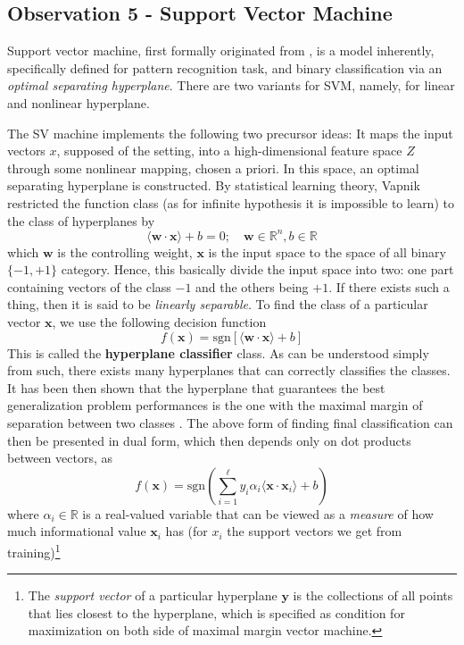 \documentclass[twoside,10pt]{article}
\begin{document}
\clearpage

\subsection{Observation 5 - Support Vector Machine}

Support vector machine, first formally originated from \cite{Vapnik1999-VAPTNO}, is a model inherently, specifically defined for pattern recognition task, and binary classification via an \textit{optimal separating hyperplane}. There are two variants for SVM, namely, for linear and nonlinear hyperplane. 

The SV machine implements the following two precursor ideas: It maps the input vectors $x$, supposed of the setting, into a high-dimensional feature space $Z$ through some nonlinear mapping, chosen a priori. In this space, an optimal separating hyperplane is constructed. By statistical learning theory, Vapnik restricted the function class (as for infinite hypothesis it is impossible to learn) to the class of hyperplanes by 
\begin{equation}
    \langle \mathbf{w}\cdot \mathbf{x} \rangle + b = 0 ; \quad \mathbf{w}\in \mathbb{R}^{n} , b\in \mathbb{R}
\end{equation}
which $\mathbf{w}$ is the controlling weight, $\mathbf{x}$ is the input space to the space of all binary $\{-1,+1\}$ category. Hence, this basically divide the input space into two: one part containing vectors of the class $-1$ and the others being $+1$. If there exists such a thing, then it is said to be \textit{linearly separable}. To find the class of a particular vector $\mathbf{x}$, we use the following decision function 
\begin{equation}
    f(\mathbf{x}) = \mathrm{sgn}[\langle \mathbf{w}\cdot \mathbf{x}\rangle+ b]
\end{equation}
This is called the \textbf{hyperplane classifier} class. As can be understood simply from such, there exists many hyperplanes that can correctly classifies the classes. It has been then shown that the hyperplane that guarantees the best generalization problem performances is the one with the maximal margin of separation between two classes \cite{Cristianini2000AnIT}. The above form of finding final classification can then be presented in dual form, which then depends only on dot products between vectors, as 
\begin{equation}
    f(\mathbf{x}) = \mathrm{sgn}\left(\sum^{\ell}_{i=1} y_{i}\alpha_{i} \langle \mathbf{x}\cdot \mathbf{x}_{i} \rangle+ b\right)
\end{equation} where $\alpha_{i}\in \mathbb{R}$ is a real-valued variable that can be viewed as a \textit{measure} of how much informational value $\mathbf{x}_{i}$ has (for $x_{i}$ the support vectors we get from training)\footnote{The \textit{support vector} of a particular hyperplane $\mathbf{y}$ is the collections of all points that lies closest to the hyperplane, which is specified as condition for maximization on both side of maximal margin vector machine.}
\end{document}
